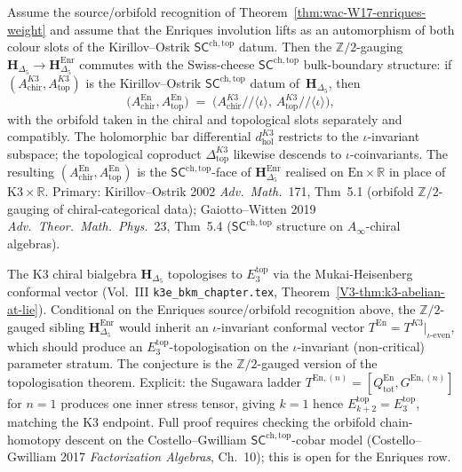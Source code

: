 \begin{theorem}
\label{thm:wac-W18-enriques-sc-face}
Assume the source/orbifold recognition of
Theorem~\ref{thm:wac-W17-enriques-weight} and assume that the
Enriques involution lifts as an automorphism of both colour slots of
the Kirillov--Ostrik $\mathsf{SC}^{\mathrm{ch,top}}$ datum. Then the
$\mathbb{Z}/2$-gauging
$\mathbf{H}_{\Delta_5}\to\mathbf{H}_{\Delta_5}^{\mathrm{Enr}}$
commutes with the Swiss-cheese $\mathsf{SC}^{\mathrm{ch,top}}$
bulk-boundary structure: if
$(A^{K3}_{\mathrm{chir}}, A^{K3}_{\mathrm{top}})$
is the Kirillov--Ostrik $\mathsf{SC}^{\mathrm{ch,top}}$ datum
of~$\mathbf{H}_{\Delta_5}$, then
\[
 \bigl(A^{\mathrm{En}}_{\mathrm{chir}}, A^{\mathrm{En}}_{\mathrm{top}}\bigr)
 \;=\;
 \bigl(A^{K3}_{\mathrm{chir}}/\!/\langle\iota\rangle,\,
 A^{K3}_{\mathrm{top}}/\!/\langle\iota\rangle\bigr),
\]
with the orbifold taken in the chiral and topological slots
separately and compatibly. The holomorphic bar differential
$d^{K3}_{\mathrm{hol}}$ restricts to the $\iota$-invariant
subspace; the topological coproduct
$\Delta^{K3}_{\mathrm{top}}$ likewise descends to
$\iota$-coinvariants. The resulting
$(A^{\mathrm{En}}_{\mathrm{chir}}, A^{\mathrm{En}}_{\mathrm{top}})$
is the $\mathsf{SC}^{\mathrm{ch,top}}$-face of
$\mathbf{H}_{\Delta_5}^{\mathrm{Enr}}$ realised on
$\mathrm{En}\times\mathbb{R}$ in place of
$\mathrm{K3}\times\mathbb{R}$. Primary:
Kirillov--Ostrik 2002 \emph{Adv.~Math.}~171, Thm~5.1 (orbifold
$\mathbb{Z}/2$-gauging of chiral-categorical data);
Gaiotto--Witten 2019 \emph{Adv.~Theor.~Math.~Phys.}~23,
Thm~5.4 ($\mathsf{SC}^{\mathrm{ch,top}}$ structure on
$A_\infty$-chiral algebras).
\end{theorem}

\begin{remark}
\label{rem:wac-W18-enriques-topologisation}
The K3 chiral bialgebra $\mathbf{H}_{\Delta_5}$ topologises to
$E_3^{\mathrm{top}}$ via the Mukai-Heisenberg conformal vector
(Vol.~III \texttt{k3e\_bkm\_chapter.tex},
Theorem~\ref{V3-thm:k3-abelian-at-lie}). Conditional on the Enriques
source/orbifold recognition above, the $\mathbb{Z}/2$-gauged sibling
$\mathbf{H}_{\Delta_5}^{\mathrm{Enr}}$ would inherit an
$\iota$-invariant conformal vector
$T^{\mathrm{En}} = T^{K3}|_{\iota\text{-even}}$, which should
produce an $E_3^{\mathrm{top}}$-topologisation on
the $\iota$-invariant (non-critical) parameter stratum. The
conjecture is the $\mathbb{Z}/2$-gauged version of the topologisation
theorem. Explicit: the Sugawara ladder
$T^{\mathrm{En},(n)} = [Q^{\mathrm{En}}_{\mathrm{tot}}, G^{\mathrm{En},(n)}]$
for $n = 1$ produces one inner stress tensor, giving
$k = 1$ hence $E_{k+2}^{\mathrm{top}} = E_3^{\mathrm{top}}$,
matching the K3 endpoint. Full proof requires checking the
orbifold chain-homotopy descent on the
Costello--Gwilliam $\mathsf{SC}^{\mathrm{ch,top}}$-cobar model
(Costello--Gwilliam 2017 \emph{Factorization Algebras}, Ch.~10);
this is open for the Enriques row.
\end{remark}

